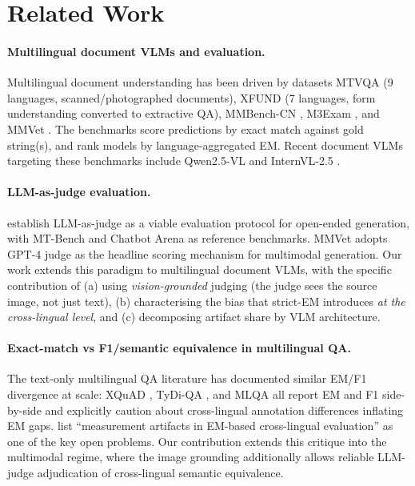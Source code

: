 \section{Related Work}
\label{sec:related}

\paragraph{Multilingual document VLMs and evaluation.}
Multilingual document understanding has been driven by datasets MTVQA \citep{tang2024mtvqa} (9 languages, scanned/photographed documents), XFUND \citep{xu2022xfund} (7 languages, form understanding converted to extractive QA), MMBench-CN \citep{liu2023mmbench}, M3Exam \citep{zhang2023m3exam}, and MMVet \citep{yu2024mmvet}. The benchmarks score predictions by exact match against gold string(s), and rank models by language-aggregated EM. Recent document VLMs targeting these benchmarks include Qwen2.5-VL \citep{bai2025qwen25vl, wang2024qwen2vl} and InternVL-2.5 \citep{chen2024internvl25}.

\paragraph{LLM-as-judge evaluation.}
\citet{zheng2024judging} establish LLM-as-judge as a viable evaluation protocol for open-ended generation, with MT-Bench and Chatbot Arena as reference benchmarks. MMVet \citep{yu2024mmvet} adopts GPT-4 judge as the headline scoring mechanism for multimodal generation. Our work extends this paradigm to multilingual document VLMs, with the specific contribution of (a) using \emph{vision-grounded} judging (the judge sees the source image, not just text), (b) characterising the bias that strict-EM introduces \emph{at the cross-lingual level}, and (c) decomposing artifact share by VLM architecture.

\paragraph{Exact-match vs F1/semantic equivalence in multilingual QA.}
The text-only multilingual QA literature has documented similar EM/F1 divergence at scale: XQuAD \citep{artetxe2020xquad}, TyDi-QA \citep{clark2020tydiqa}, and MLQA \citep{lewis2020mlqa} all report EM and F1 side-by-side and explicitly caution about cross-lingual annotation differences inflating EM gaps. \citet{ruder2021xtreme-r} list ``measurement artifacts in EM-based cross-lingual evaluation'' as one of the key open problems. Our contribution extends this critique into the multimodal regime, where the image grounding additionally allows reliable LLM-judge adjudication of cross-lingual semantic equivalence.

